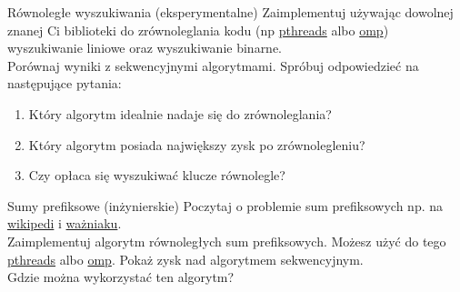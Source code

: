 \begin{exercise}{Równoległe wyszukiwania (eksperymentalne)}{}
Zaimplementuj używając dowolnej znanej Ci biblioteki do zrównoleglania kodu (np \href{https://pubs.opengroup.org/onlinepubs/7908799/xsh/pthread.h.html}{pthreads} albo \href{https://pl.wikipedia.org/wiki/OpenMP}{omp}) wyszukiwanie liniowe oraz wyszukiwanie binarne. \\
Porównaj wyniki z sekwencyjnymi algorytmami. Spróbuj odpowiedzieć na następujące pytania:
\begin{enumerate}
    \item Który algorytm idealnie nadaje się do zrównoleglania?
    \item Który algorytm posiada największy zysk po zrównolegleniu?
    \item Czy opłaca się wyszukiwać klucze równolegle?
\end{enumerate}
\end{exercise}

\begin{exercise}{Sumy prefiksowe (inżynierskie)}{}
Poczytaj o problemie sum prefiksowych np. na \href{https://en.wikipedia.org/wiki/Prefix_sum}{wikipedi} i \href{http://wazniak.mimuw.edu.pl/index.php?title=Zaawansowane_algorytmy_i_struktury_danych/Wyk\%C5\%82ad_13}{ważniaku}. \\
Zaimplementuj algorytm równoległych sum prefiksowych. Możesz użyć do tego \href{https://pubs.opengroup.org/onlinepubs/7908799/xsh/pthread.h.html}{pthreads} albo \href{https://pl.wikipedia.org/wiki/OpenMP}{omp}. Pokaż zysk nad algorytmem sekwencyjnym. \\
Gdzie można wykorzystać ten algorytm?
\end{exercise}


